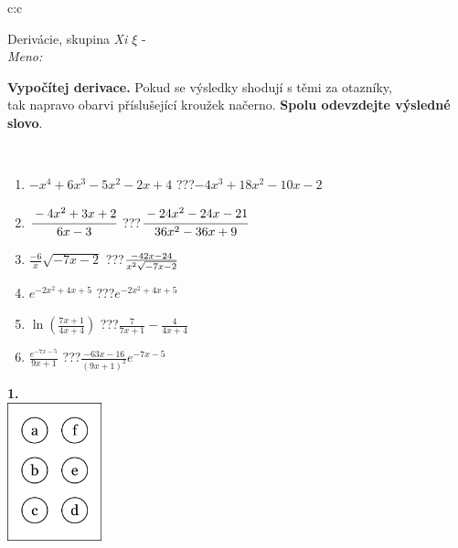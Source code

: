 \documentclass[10pt]{report}
\begin{document}
\begin{tabular}{c:c}
\begin{minipage}[c][104.5mm][t]{0.5\linewidth}
\begin{center}
\vspace{7mm}
{\huge Derivácie, skupina \textit{Xi $\xi$} -}\\[5mm]
\textit{Meno:}\phantom{xxxxxxxxxxxxxxxxxxxxxxxxxxxxxxxxxxxxxxxxxxxxxxxxxxxxxxxxxxxxxxxxx}\\[5mm]
\begin{minipage}{0.95\linewidth}
\begin{center}
\textbf{Vypočítej derivace.} Pokud se výsledky shodují s těmi za otazníky,\\tak napravo obarvi příslušející kroužek načerno. \textbf{Spolu odevzdejte výsledné slovo}.
\end{center}
\end{minipage}
\\[1mm]
\begin{minipage}{0.79\linewidth}
\begin{center}
\begin{varwidth}{\linewidth}
\begin{enumerate}
\normalsize
\item $-x^4+6x^3-5x^2-2x+4$\quad \dotfill\; ???\;\dotfill \quad $-4x^3+18x^2-10x-2$
\item $\cfrac{-4x^2+3x+2}{6x-3}$\quad \dotfill\; ???\;\dotfill \quad $\cfrac{-24x^2-24x-21}{36x^2-36x+9}$
\item $\frac{-6}{x}\sqrt{-7x-2}$\quad \dotfill\; ???\;\dotfill \quad $\frac{-42x-24}{x^2 \sqrt{\smash[b]{-7x-2}}}$
\item $e^{-2x^2+4x+5}$\quad \dotfill\; ???\;\dotfill \quad $e^{-2x^2+4x+5}$
\item $\ln{\left(\frac{7x+1}{4x+4}\right)}$\quad \dotfill\; ???\;\dotfill \quad $\frac{7}{7x+1}-\frac{4}{4x+4}$
\item $\frac{e^{-7x-5}}{9x+1}$\quad \dotfill\; ???\;\dotfill \quad $\frac{-63x-16}{(9x+1)^2}e^{-7x-5}$
\end{enumerate}
\end{varwidth}
\end{center}
\end{minipage}
\begin{minipage}{0.20\linewidth}
\begin{center}
{\Huge\bfseries 1.} \\[2mm]
\includegraphics[height=40mm]{../images/braille.png}

\end{center}
\end{minipage}
\end{center}
\end{minipage}
\end{tabular}
\end{document}
